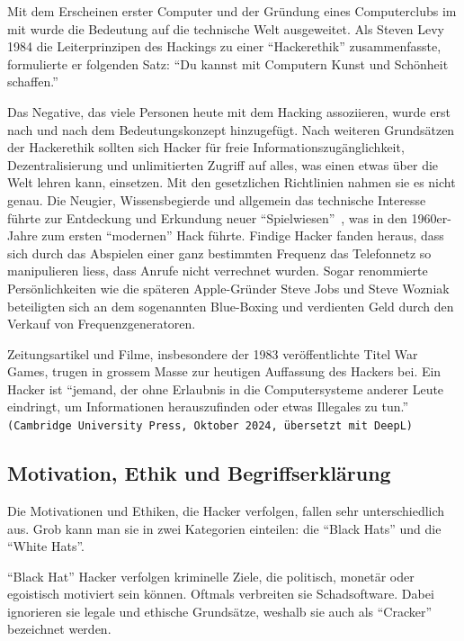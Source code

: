 \documentclass[11pt, a4paper]{article}
\begin{document}
Mit dem Erscheinen erster Computer und der Gründung eines Computerclubs im \gls{mit} wurde die Bedeutung auf die technische Welt ausgeweitet. Als Steven Levy 1984 die Leiterprinzipen des Hackings zu einer ``Hackerethik'' zusammenfasste, formulierte er folgenden Satz: ``Du kannst mit Computern Kunst und Schönheit schaffen.''~\cite{bpbKleineGeschichte:online}

Das Negative, das viele Personen heute mit dem Hacking assoziieren, wurde erst nach und nach dem Bedeutungskonzept hinzugefügt. Nach weiteren Grundsätzen der Hackerethik sollten sich Hacker für freie Informationszugänglichkeit, Dezentralisierung und unlimitierten Zugriff auf alles, was einen etwas über die Welt lehren kann, einsetzen. Mit den gesetzlichen Richtlinien nahmen sie es nicht genau. Die Neugier, Wissensbegierde und allgemein das technische Interesse führte zur Entdeckung und Erkundung neuer ``Spielwiesen''~\cite{bpbKleineGeschichte:online}, was in den 1960er-Jahre zum ersten ``modernen'' Hack führte. Findige Hacker fanden heraus, dass sich durch das Abspielen einer ganz bestimmten Frequenz das Telefonnetz so manipulieren liess, dass Anrufe nicht verrechnet wurden. Sogar renommierte Persönlichkeiten wie die späteren Apple-Gründer Steve Jobs und Steve Wozniak beteiligten sich an dem sogenannten Blue-Boxing und verdienten Geld durch den Verkauf von Frequenzgeneratoren.

Zeitungsartikel und Filme, insbesondere der 1983 veröffentlichte Titel War Games, trugen in grossem Masse zur heutigen Auffassung des Hackers bei.  Ein Hacker ist ``jemand, der ohne Erlaubnis in die Computersysteme anderer Leute eindringt, um Informationen herauszufinden oder etwas Illegales zu tun.'' \texttt{(Cambridge University Press, Oktober 2024, übersetzt mit DeepL)} \cite{bpbKleineGeschichte:online, CambridgeHacker:online}

\subsection{Motivation, Ethik und Begriffserklärung}
Die Motivationen und Ethiken, die Hacker verfolgen, fallen sehr unterschiedlich aus. Grob kann man sie in zwei Kategorien einteilen: die ``Black Hats'' und die ``White Hats''.

``Black Hat'' Hacker verfolgen kriminelle Ziele, die politisch, monetär oder egoistisch motiviert sein können. Oftmals verbreiten sie Schadsoftware. Dabei ignorieren sie legale und ethische Grundsätze, weshalb sie auch als ``Cracker'' bezeichnet werden.
\end{document}
